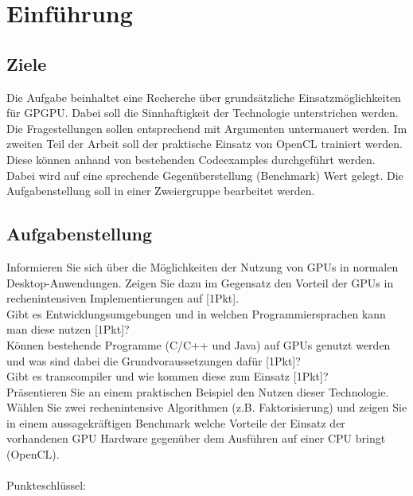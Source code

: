\documentclass[letterpaper, 12pt]{article}
\let\tempsection\section
\renewcommand\section[1]{\vspace{-0.3cm}\tempsection{#1}\vspace{-0.3cm}}
\let\tempsubsection\subsection
\renewcommand\subsection[1]{\vspace{0cm}\tempsubsection{#1}\vspace{0cm}}
\begin{document}
\parindent 0pt
\parskip 6pt



\clearpage
\thispagestyle{empty}
\tableofcontents

\newpage
{}
\pagestyle{fancy}

\section{Einführung}
\subsection{Ziele}
Die Aufgabe beinhaltet eine Recherche über grundsätzliche Einsatzmöglichkeiten für GPGPU. Dabei soll die Sinnhaftigkeit der Technologie unterstrichen werden. Die Fragestellungen sollen entsprechend mit Argumenten untermauert werden.
Im zweiten Teil der Arbeit soll der praktische Einsatz von OpenCL trainiert werden. Diese können anhand von bestehenden Codeexamples durchgeführt werden. Dabei wird auf eine sprechende Gegenüberstellung (Benchmark) Wert gelegt.
Die Aufgabenstellung soll in einer Zweiergruppe bearbeitet werden.

\subsection{Aufgabenstellung}
Informieren Sie sich über die Möglichkeiten der Nutzung von GPUs in normalen Desktop-Anwendungen. Zeigen Sie dazu im Gegensatz den Vorteil der GPUs in rechenintensiven Implementierungen auf [1Pkt]. \\
Gibt es Entwicklungsumgebungen und in welchen Programmiersprachen kann man diese nutzen [1Pkt]? \\
Können bestehende Programme (C/C++ und Java) auf GPUs genutzt werden und was sind dabei die Grundvoraussetzungen dafür [1Pkt]? \\ Gibt es transcompiler und wie kommen diese zum Einsatz [1Pkt]? \\

Präsentieren Sie an einem praktischen Beispiel den Nutzen dieser Technologie. Wählen Sie zwei rechenintensive Algorithmen (z.B. Faktorisierung) und zeigen Sie in einem aussagekräftigen Benchmark welche Vorteile der Einsatz der vorhandenen GPU Hardware gegenüber dem Ausführen auf einer CPU bringt (OpenCL). \\  \\ Punkteschlüssel: \\
\end{document}
